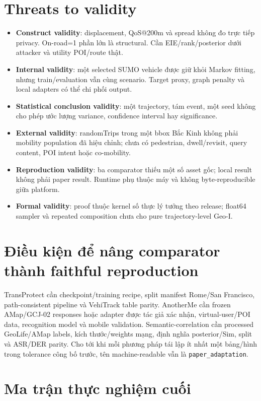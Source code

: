 \documentclass[12pt,a4paper,oneside]{report}
\begin{document}
\section{Threats to validity}

\begin{itemize}
  \item \textbf{Construct validity}: displacement, QoS@200m và spread không đo trực tiếp privacy. On-road=1 phần lớn là structural. Cần EIE/rank/posterior dưới attacker và utility POI/route thật.
  \item \textbf{Internal validity}: một selected SUMO vehicle được giữ khỏi Markov fitting, nhưng train/evaluation vẫn cùng scenario. Target proxy, graph penalty và local adapters có thể chi phối output.
  \item \textbf{Statistical conclusion validity}: một trajectory, tám event, một seed không cho phép ước lượng variance, confidence interval hay significance.
  \item \textbf{External validity}: randomTrips trong một bbox Bắc Kinh không phải mobility population đã hiệu chỉnh; chưa có pedestrian, dwell/revisit, query content, POI intent hoặc co-mobility.
  \item \textbf{Reproduction validity}: ba comparator thiếu một số asset gốc; local result không phải paper result. Runtime phụ thuộc máy và không byte-reproducible giữa platform.
  \item \textbf{Formal validity}: proof thuộc kernel số thực lý tưởng theo release; float64 sampler và repeated composition chưa cho pure trajectory-level Geo-I.
\end{itemize}

\section{Điều kiện để nâng comparator thành faithful reproduction}

TransProtect cần checkpoint/training recipe, split manifest Rome/San Francisco, path-consistent pipeline và VehiTrack table parity. AnotherMe cần frozen AMap/GCJ-02 responses hoặc adapter được tác giả xác nhận, virtual-user/POI data, recognition model và mobile validation. Semantic-correlation cần processed GeoLife/AMap labels, kích thước/weights mạng, định nghĩa posterior/Sim, split và ASR/DER parity. Cho tới khi mỗi phương pháp tái lập ít nhất một bảng/hình trong tolerance công bố trước, tên machine-readable vẫn là \texttt{paper\_adaptation}.

\section{Ma trận thực nghiệm cuối}
\end{document}
